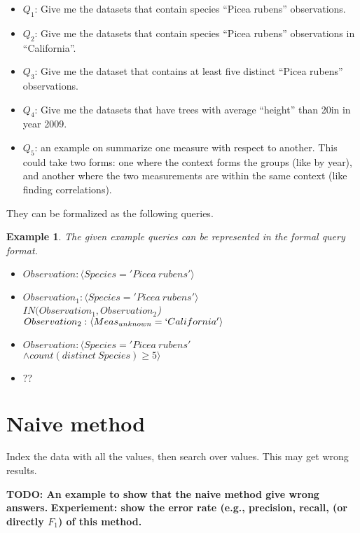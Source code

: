 \documentclass[conference]{IEEEtran}
\newtheorem{example}{Example}[section]
\begin{document}
\begin{itemize}
\item $Q_1$: Give me the datasets that contain species ``Picea rubens'' observations.
\item $Q_2$: Give me the datasets that contain species ``Picea rubens''
  observations in ``California''. 
\item $Q_3$: Give me the dataset that contains at least five distinct ``Picea rubens'' observations.
\item $Q_4$: Give me the datasets that have trees with average ``height''
  than 20in in year 2009. 
\item $Q_5$: an example on summarize one measure with respect to another.
This could take two forms: one where the context forms the groups
(like by year), and another where the two measurements are within the
same context (like finding correlations).
\end{itemize}

They can be formalized as the following queries. 

\begin{example}
The given example queries can be represented in the formal query
format. 
\begin{itemize}
\item $Observation: \langle Species='Picea~rubens'\rangle$
\item $Observation_1: \langle Species='Picea~rubens'\rangle$\\
  $IN(Observation_1, Observation_2$) \\
$Observation_2: \langle Meas_{unknown}=`California'\rangle$
\item $Observation: \langle Species='Picea~rubens' $\\
$\wedge
  count(distinct~Species)\geq 5\rangle$
\item $??$
\end{itemize}

\end{example}

\section{Naive method}\label{sec:naive}
Index the data with all the values, then search over values. 
This may get wrong results. 

{\bf TODO: An example to show that the naive method give wrong answers.}
{\bf Experiement: show the error rate (e.g., precision, recall, (or
  directly $F_1$) of this method.}
\end{document}
